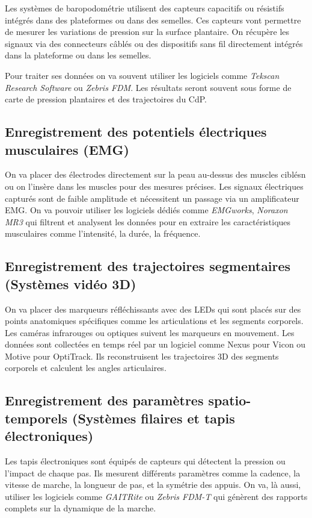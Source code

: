 Les systèmes de baropodométrie utilisent des capteurs capacitifs ou résistifs intégrés dans des plateformes ou dans des semelles.
Ces capteurs vont permettre de mesurer les variations de pression sur la surface plantaire. On récupère les signaux via des connecteurs câblés ou des dispositifs sans fil directement intégrés dans la plateforme ou dans les semelles. 

Pour traiter ses données on va souvent utiliser les logiciels comme \textit{Tekscan Research Software} ou \textit{Zebris FDM}.
Les résultats seront souvent sous forme de carte de pression plantaires et des trajectoires du CdP.

\subsection{Enregistrement des potentiels électriques musculaires (EMG)}

On va placer des électrodes directement sur la peau au-dessus des muscles ciblésn ou on l’insère dans les muscles pour des mesures précises.
Les signaux électriques capturés sont de faible amplitude et nécessitent un passage via un amplificateur EMG.
On va pouvoir utiliser les logiciels dédiés comme \textit{EMGworks}, \textit{Noraxon MR3} qui filtrent et analysent les données pour en extraire les caractéristiques musculaires comme l’intensité, la durée, la fréquence.

\subsection{Enregistrement des trajectoires segmentaires (Systèmes vidéo 3D)}

On va placer des marqueurs réfléchissants avec des LEDs qui sont placés sur des points anatomiques spécifiques comme les articulations et les segments corporels.
Les caméras infrarouges ou optiques suivent les marqueurs en mouvement. 
Les données sont collectées en temps réel par un logiciel comme Nexus pour Vicon ou Motive pour OptiTrack.
Ils reconstruisent les trajectoires 3D des segments corporels et calculent les angles articulaires.


\subsection{Enregistrement des paramètres spatio-temporels (Systèmes filaires et tapis électroniques)}

Les tapis électroniques sont équipés de capteurs qui détectent la pression ou l’impact de chaque pas.
Ils mesurent différents paramètres comme la cadence, la vitesse de marche, la longueur de pas, et la symétrie des appuis.
On va, là aussi, utiliser les logiciels comme \textit{GAITRite} ou \textit{Zebris FDM-T} qui génèrent des rapports complets sur la dynamique de la marche.
